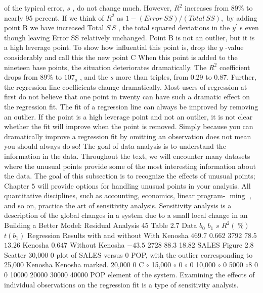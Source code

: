\documentclass[11pt]{article}
\begin{document}
of the typical error, \(s\) , do not change much. However, \(R^{2}\) increases from 89\%
 to nearly 95 percent. If we think of \(R^{2}\) as \(1-( E r r o r ~ S S ) / ( T o t a l ~ S S ) ,\) by adding
point \(\mathrm{B}\) we have increased Total \(S \, S\) , the total squared deviations in the \(y^{\prime}\) s even
 though leaving Error SS relatively unchanged. Point \(\mathrm{B}\) is not an outlier, but it is
a high leverage point.
To show how influential this point is, drop the \(y\) -value considerably and call
this the new point \(\mathrm{C}\) When this point is added to the nineteen base points,
the situation deteriorates dramatically. The \(R^{2}\) coefficient drops from 89\% to
\(1 0 7_{o}\) , and the \(s\) more than triples, from 0.29 to 0.87. Further, the regression line
coefficients change dramatically.
Most users of regression at first do not believe that one point in twenty can
have such a dramatic effect on the regression fit. The fit of a regression line can
 always be improved by removing an outlier. If the point is a high leverage point 
and not an outlier, it is not clear whether the fit will improve when the point is
removed.
Simply because you can dramatically improve a regression fit by omitting an
 observation does not mean you should always do so! The goal of data analysis is
to understand the information in the data. Throughout the text, we will encounter
 many datasets where the unusual points provide some of the most interesting
information about the data. The goal of this subsection is to recognize the effects
 of unusual points; Chapter \(5\) will provide options for handling unusual points in
 your analysis.
All quantitative disciplines, such as accounting, economics, linear program-
\(\operatorname* {m i n g}\) , and so on, practice the art of sensitivity analysis. Sensitivity analysis is a
 description of the global changes in a system due to a small local change in an
 Building a Better Model: Residual Analysis 45
Table 2.7
Data \(b_{0}\) \(b_{1}\) \(s\) \(R^{2} ( \ \% )\) \(t ( b_{1} )\) Regression Results
with and without
 With Kenosha \(4 6 9 . 7\) 0.662 3792 \(7 8 . 5\) \(1 3 . 2 6\) Kenosha
\(0 . 6 4 7\)
 Without Kenosha \(- 4 3 . 5\) 2728 88.3 18.82
SALES Figure 2.8 Scatter
30,000 0 plot of SALES versus
0 POP, with the outlier
corresponding to
 25,000 Kenosha Kenosha marked.
20,000 0 C \(\circ\)
15,000 \(\circ\) 0 \(\circ\) 0
10,000 \(\circ\) 0
5000 \(\circ8\)
0
0 10000 20000 30000 40000
POP
element of the system. Examining the effects of individual observations on the
regression fit is a type of sensitivity analysis.
\end{document}
